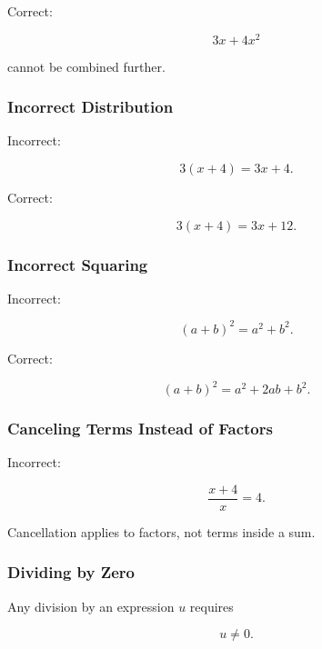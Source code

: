Correct:

\[ 3x+4x^2 \]

cannot be combined further.

\subsubsection{Incorrect Distribution}
\label{subsec:error-distribution}

Incorrect:

\[ 3(x+4)=3x+4. \]

Correct:

\[ 3(x+4)=3x+12. \]

\subsubsection{Incorrect Squaring}
\label{subsec:error-square-binomial}

Incorrect:

\[ (a+b)^2=a^2+b^2. \]

Correct:

\[ (a+b)^2=a^2+2ab+b^2. \]

\subsubsection{Canceling Terms Instead of Factors}
\label{subsec:error-cancel-terms}

Incorrect:

\[ \frac{x+4}{x}=4. \]

Cancellation applies to factors, not terms inside a sum.

\subsubsection{Dividing by Zero}
\label{subsec:error-divide-zero}

Any division by an expression \(u\) requires

\[ u\neq0. \]

